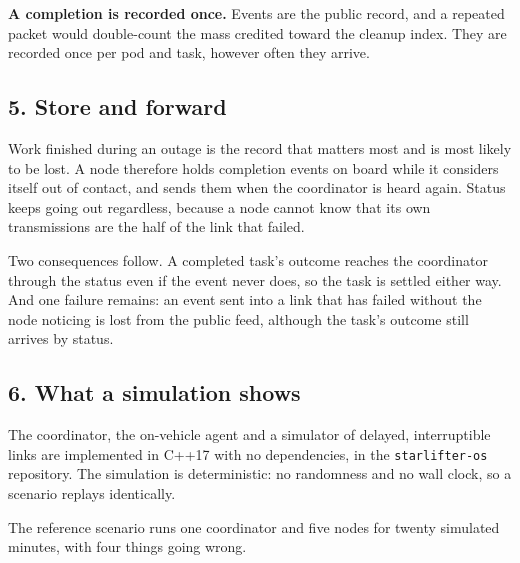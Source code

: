 \documentclass[
  12pt,
  letterpaper,
]{article}
\begin{document}
\textbf{A completion is recorded once.} Events are the public record,
and a repeated packet would double-count the mass credited toward the
cleanup index. They are recorded once per pod and task, however often
they arrive.

\hypertarget{store-and-forward}{%
\subsection{5. Store and forward}\label{store-and-forward}}

Work finished during an outage is the record that matters most and is
most likely to be lost. A node therefore holds completion events on
board while it considers itself out of contact, and sends them when the
coordinator is heard again. Status keeps going out regardless, because a
node cannot know that its own transmissions are the half of the link
that failed.

Two consequences follow. A completed task's outcome reaches the
coordinator through the status even if the event never does, so the task
is settled either way. And one failure remains: an event sent into a
link that has failed without the node noticing is lost from the public
feed, although the task's outcome still arrives by status.

\hypertarget{what-a-simulation-shows}{%
\subsection{6. What a simulation shows}\label{what-a-simulation-shows}}

The coordinator, the on-vehicle agent and a simulator of delayed,
interruptible links are implemented in C++17 with no dependencies, in
the \texttt{starlifter-os} repository. The simulation is deterministic:
no randomness and no wall clock, so a scenario replays identically.

The reference scenario runs one coordinator and five nodes for twenty
simulated minutes, with four things going wrong.
\end{document}
